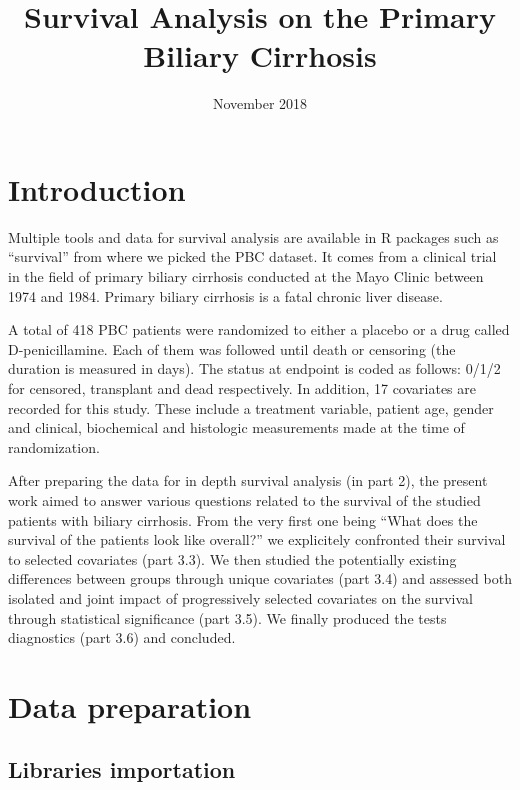 \documentclass[]{article}
\title{Survival Analysis on the Primary Biliary Cirrhosis}
\author{}
\date{November 2018}
\begin{document}
\maketitle

{
\setcounter{tocdepth}{2}
\tableofcontents
}
\section{Introduction}\label{introduction}

Multiple tools and data for survival analysis are available in R
packages such as ``survival'' from where we picked the PBC dataset. It
comes from a clinical trial in the field of primary biliary cirrhosis
conducted at the Mayo Clinic between 1974 and 1984. Primary biliary
cirrhosis is a fatal chronic liver disease.

A total of 418 PBC patients were randomized to either a placebo or a
drug called D-penicillamine. Each of them was followed until death or
censoring (the duration is measured in days). The status at endpoint is
coded as follows: 0/1/2 for censored, transplant and dead respectively.
In addition, 17 covariates are recorded for this study. These include a
treatment variable, patient age, gender and clinical, biochemical and
histologic measurements made at the time of randomization.

After preparing the data for in depth survival analysis (in part 2), the
present work aimed to answer various questions related to the survival
of the studied patients with biliary cirrhosis. From the very first one
being ``What does the survival of the patients look like overall?'' we
explicitely confronted their survival to selected covariates (part 3.3).
We then studied the potentially existing differences between groups
through unique covariates (part 3.4) and assessed both isolated and
joint impact of progressively selected covariates on the survival
through statistical significance (part 3.5). We finally produced the
tests diagnostics (part 3.6) and concluded.

\section{Data preparation}\label{data-preparation}

\subsection{Libraries importation}\label{libraries-importation}
\end{document}
